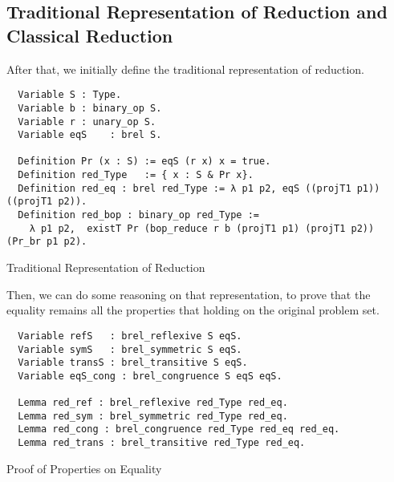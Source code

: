 \subsection{Traditional Representation of Reduction and Classical Reduction}
After that, we initially define the traditional representation of reduction.

\begin{listing}[H]
\begin{verbatim}
  Variable S : Type. 
  Variable b : binary_op S.
  Variable r : unary_op S.
  Variable eqS    : brel S.
  
  Definition Pr (x : S) := eqS (r x) x = true.  
  Definition red_Type   := { x : S & Pr x}.
  Definition red_eq : brel red_Type := λ p1 p2, eqS ((projT1 p1)) ((projT1 p2)).
  Definition red_bop : binary_op red_Type :=
    λ p1 p2,  existT Pr (bop_reduce r b (projT1 p1) (projT1 p2)) (Pr_br p1 p2).
\end{verbatim}
\caption{Traditional Representation of Reduction} 
\label{coq:def:traditional_representation}
\end{listing}

Then, we can do some reasoning on that representation, to prove that the equality remains all the properties that holding on the original problem set.
\begin{listing}[H]
\begin{verbatim}
  Variable refS   : brel_reflexive S eqS. 
  Variable symS   : brel_symmetric S eqS. 
  Variable transS : brel_transitive S eqS.
  Variable eqS_cong : brel_congruence S eqS eqS.
  
  Lemma red_ref : brel_reflexive red_Type red_eq. 
  Lemma red_sym : brel_symmetric red_Type red_eq. 
  Lemma red_cong : brel_congruence red_Type red_eq red_eq. 
  Lemma red_trans : brel_transitive red_Type red_eq. 
\end{verbatim}
\caption{Proof of Properties on Equality} 
\label{coq:proof:tr_eq}
\end{listing}

